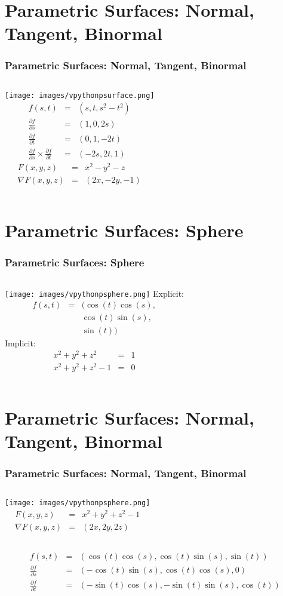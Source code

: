 \documentclass[slidestop,xcolor=pst]{beamer}
\newcommand{\sect}[1]{
\section{#1}
\begin{frame}[fragile]\frametitle{#1}
}
\begin{document}
\sect{Parametric Surfaces: Normal, Tangent, Binormal}
\begin{columns}[c]
\texttt{[image: images/vpythonpsurface.png]}
\begin{eqnarray*}
f(s,t) &=& (s, t, s^2-t^2)\\
\frac{\partial f}{\partial s} &=& (1, 0, 2s)\\
\frac{\partial f}{\partial t} &=& (0, 1, -2t)\\
\frac{\partial f}{\partial s} \times
\frac{\partial f}{\partial t} &=& (-2s, 2t, 1)
\end{eqnarray*}
\begin{eqnarray*}
F(x,y,z) &=& x^2 - y^2 - z\\
\nabla F(x,y,z) &=& (2x, -2y, -1)
\end{eqnarray*}
\end{columns}
\end{frame}

\sect{Parametric Surfaces: Sphere}
\begin{columns}[c]
\texttt{[image: images/vpythonpsphere.png]}
Explicit:
\begin{eqnarray*}
f(s,t) &=& (\cos(t)\cos(s),\\&&\cos(t)\sin(s),\\&&\sin(t))
\end{eqnarray*}
Implicit:
\begin{eqnarray*}
x^2 + y^2 + z^2 &=& 1\\
x^2 + y^2 + z^2 - 1 &=& 0
\end{eqnarray*}
\end{columns}
\end{frame}

\sect{Parametric Surfaces: Normal, Tangent, Binormal}
\begin{columns}[c]
\texttt{[image: images/vpythonpsphere.png]}
\begin{eqnarray*}
F(x,y,z) &=& x^2 + y^2 + z^2 - 1 \\
\nabla F(x,y,z) &=& (2x, 2y, 2z)
\end{eqnarray*}
\end{columns}
\begin{eqnarray*}
f(s,t) &=& (\cos(t)\cos(s),\cos(t)\sin(s),\sin(t))\\
\frac{\partial f}{\partial s} &=& (-\cos(t)\sin(s),
                                   \cos(t)\cos(s),
                                   0)\\
\frac{\partial f}{\partial t} &=& (-\sin(t)\cos(s),
                                   -\sin(t)\sin(s),
                                    \cos(t))\\
\end{eqnarray*}
\end{frame}
\end{document}
